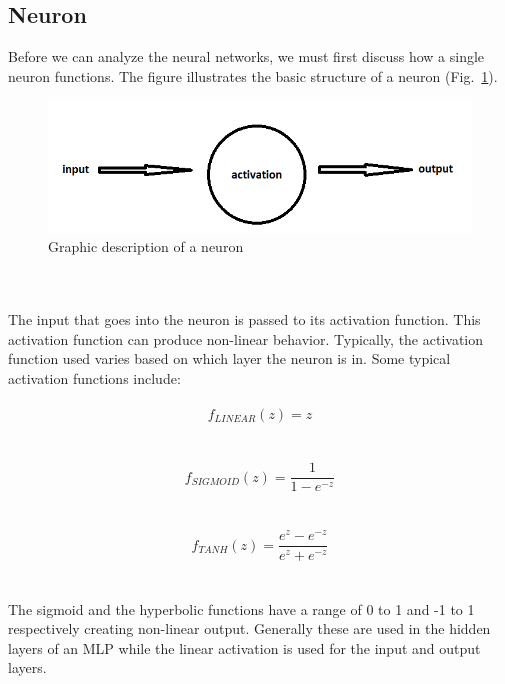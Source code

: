 \documentclass[12pt,twoside]{article} %
\begin{document}
\subsection{Neuron}
Before we can analyze the neural networks, we must first discuss how a single neuron functions. The figure illustrates the basic structure of a neuron (Fig.~\ref{fig:neuron}).
\begin{figure}
	\includegraphics[scale=0.7]{neuron}
	\caption{Graphic description of a neuron}
	\label{fig:neuron}
\end{figure}
\\\\
The input that goes into the neuron is passed to its activation function. This activation function can produce non-linear behavior. Typically, the activation function used varies based on which layer the neuron is in. Some typical activation functions include:\\\\
$$f_{LINEAR}(z) = z$$\\\\
$$f_{SIGMOID}(z) = \frac{1}{1-e^{-z}}$$\\\\
$$f_{TANH}(z) = \frac{e^z-e^{-z}}{e^z+e^{-z}}$$\\\\
The sigmoid and the hyperbolic functions have a range of 0 to 1 and -1 to 1 respectively creating non-linear output. Generally these are used in the hidden layers of an MLP while the linear activation is used for the input and output layers.
\\\\
\end{document}
